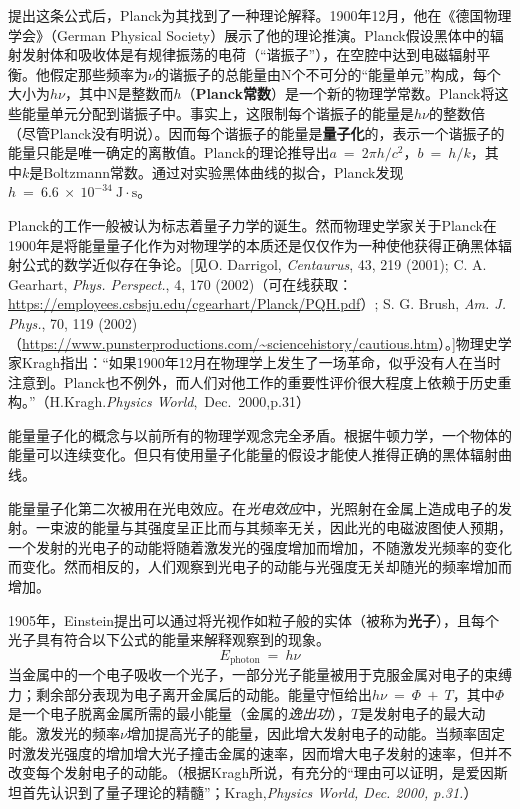 \documentclass[12pt,a4paper,openany]{ctexbook}
\begin{document}
\begin{flushleft}
提出这条公式后，Planck为其找到了一种理论解释。1900年12月，他在《德国物理学会》（German Physical Society）展示了他的理论推演。Planck假设黑体中的辐射发射体和吸收体是有规律振荡的电荷（“谐振子”），在空腔中达到电磁辐射平衡。他假定那些频率为$\nu$的谐振子的总能量由N个不可分的“能量单元”构成，每个大小为$h\nu$，其中N是整数而$h$（\textbf{Planck常数}）是一个新的物理学常数。Planck将这些能量单元分配到谐振子中。事实上，这限制每个谐振子的能量是$h\nu$的整数倍（尽管Planck没有明说）。因而每个谐振子的能量是\textbf{量子化}的，表示一个谐振子的能量只能是唯一确定的离散值。Planck的理论推导出$a\ =\ 2\pi h/c^2$，$b\ =\ h/k$，其中$k$是Boltzmann常数。通过对实验黑体曲线的拟合，Planck发现$h\ =\ 6.6\ \times\ 10^{-34}\ \mathrm{J} \cdot \mathrm{s}$。

Planck的工作一般被认为标志着量子力学的诞生。然而物理史学家关于Planck在1900年是将能量量子化作为对物理学的本质还是仅仅作为一种使他获得正确黑体辐射公式的数学近似存在争论。[\textnormal{见O. Darrigol, \textit{Centaurus}, 43, 219 (2001); C. A. Gearhart, \textit{Phys. Perspect.}, 4, 170 (2002)（可在线获取：\url{https://employees.csbsju.edu/cgearhart/Planck/PQH.pdf}）; S. G. Brush, \textit{Am. J. Phys.}, 70, 119 (2002)（\url{https://www.punsterproductions.com/~sciencehistory/cautious.htm}）。}]物理史学家Kragh指出：“如果1900年12月在物理学上发生了一场革命，似乎没有人在当时注意到。Planck也不例外，而人们对他工作的重要性评价很大程度上依赖于历史重构。”（H.Kragh.\textit{Physics World},\ Dec.\ 2000,p.31）

能量量子化的概念与以前所有的物理学观念完全矛盾。根据牛顿力学，一个物体的能量可以连续变化。但只有使用量子化能量的假设才能使人推得正确的黑体辐射曲线。

能量量子化第二次被用在光电效应。在\textit{光电效应}中，光照射在金属上造成电子的发射。一束波的能量与其强度呈正比而与其频率无关，因此光的电磁波图使人预期，一个发射的光电子的动能将随着激发光的强度增加而增加，不随激发光频率的变化而变化。然而相反的，人们观察到光电子的动能与光强度无关却随光的频率增加而增加。

1905年，Einstein提出可以通过将光视作如粒子般的实体（被称为\textbf{光子}），且每个光子具有符合以下公式的能量来解释观察到的现象。
\begin{equation}
\boxed{E_{\text{photon}}\ = \ h\nu}
\end{equation}
当金属中的一个电子吸收一个光子，一部分光子能量被用于克服金属对电子的束缚力；剩余部分表现为电子离开金属后的动能。能量守恒给出$h\nu\ =\ \Phi\ +\ T$，其中$\Phi$是一个电子脱离金属所需的最小能量（金属的\textit{逸出功}），$T$是发射电子的最大动能。激发光的频率$\nu$增加提高光子的能量，因此增大发射电子的动能。当频率固定时激发光强度的增加增大光子撞击金属的速率，因而增大电子发射的速率，但并不改变每个发射电子的动能。（根据Kragh所说，有充分的“理由可以证明，是爱因斯坦首先认识到了量子理论的精髓”；Kragh,\textit{Physics World, Dec. 2000, p.31.}）


\end{flushleft}
\end{document}
